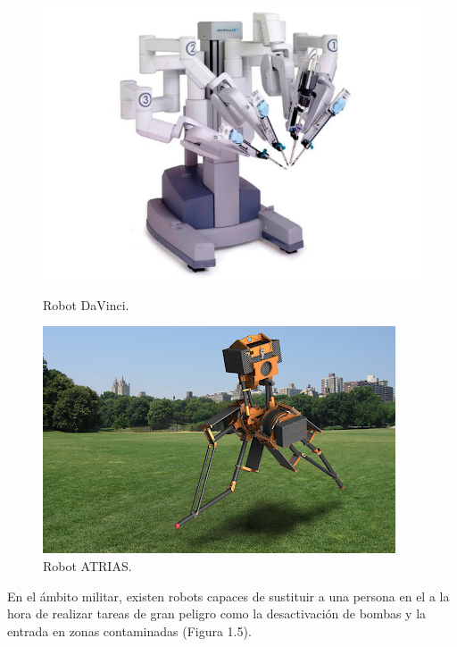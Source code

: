 \documentclass[a4paper, 12pt]{book}
\begin{document}
\begin{figure}[H]
  \centering
  \begin{minipage}[b]{0.4\textwidth}
    \includegraphics[width=\textwidth]{img/davinci}
    \caption{Robot DaVinci.}
    \label{figura:robot_davinci}
  \end{minipage}
  \hfill
  \begin{minipage}[b]{0.4\textwidth}
    \includegraphics[width=\textwidth]{img/atrias}
    \caption{Robot ATRIAS.}
    \label{figura:robot_atrias}
  \end{minipage}
\end{figure}

En el ámbito militar, existen robots capaces de sustituir a una persona en el a la hora de realizar tareas de gran peligro como la desactivación de bombas y la entrada en zonas contaminadas (Figura 1.5).
\end{document}
